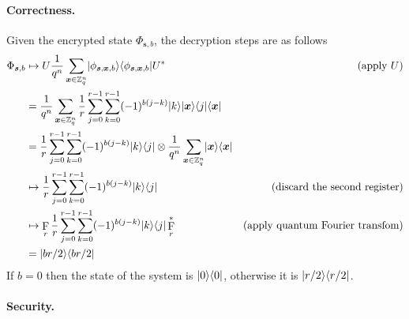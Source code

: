 \documentclass[11pt]{article}
\theoremstyle{plain}
\theoremstyle{definition}
\DeclareMathOperator{\qft}{F}
\DeclarePairedDelimiter{\ldbrac}{\lvert}{\rangle}
\DeclarePairedDelimiter{\rdbrac}{\langle}{\rvert}
\def\Z{\ensuremath{\mathbb{Z}}}
\begin{document}
\paragraph{Correctness.} 
Given the encrypted state $\Phi_{\bm{s}, b}$, the decryption steps are as follows
\begin{align*}
    \Phi_{\bm{s}, b}
    & \mapsto U \frac{1}{q^n} \sum_{\bm{x} \in \Z_q^n} \ldbrac{\phi_{\bm{s}, \bm{x}, b}} \rdbrac{\phi_{\bm{s}, \bm{x}, b}} U^* & (\text{apply } U)\\
    & = \frac{1}{q^n} \sum_{\bm{x} \in \Z_q^n} \frac{1}{r} \sum_{j = 0}^{r - 1} \sum_{k = 0}^{r - 1} (-1)^{b(j - k)}\ldbrac{k}\ldbrac{\bm{x}} \rdbrac{j}\rdbrac{\bm{x}} \\
    & = \frac{1}{r} \sum_{j = 0}^{r - 1} \sum_{k = 0}^{r - 1} (-1)^{b(j - k)}\ldbrac{k}\rdbrac{j} \otimes \frac{1}{q^n} \sum_{\bm{x} \in \Z_q^n} \ldbrac{\bm{x}}\rdbrac{\bm{x}} \\
    & \mapsto \frac{1}{r} \sum_{j = 0}^{r - 1} \sum_{k = 0}^{r - 1} (-1)^{b(j - k)}\ldbrac{k}\rdbrac{j} & (\text{discard the second register}) \\
    & \mapsto \qft_r \frac{1}{r} \sum_{j = 0}^{r - 1} \sum_{k = 0}^{r - 1} (-1)^{b(j - k)}\ldbrac{k}\rdbrac{j} \qft_r^* & (\text{apply quantum Fourier transfom})\\
    & = \ldbrac{br/2} \rdbrac{br/2}
\end{align*}
If $b = 0$ then the state of the system is $\ldbrac{0} \rdbrac{0}$, otherwise it is $\ldbrac{r / 2} \rdbrac{r / 2}$. 

\paragraph{Security.}




\end{document}
